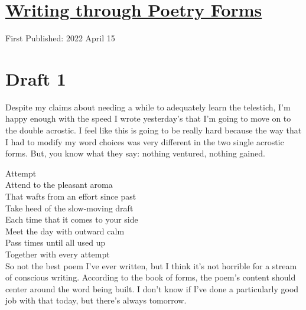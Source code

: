 \documentclass[12pt]{article}[titlepage]
\newcommand{\1}{\={a}}
\newcommand{\2}{\={e}}
\newcommand{\3}{\={\i}}
\newcommand{\4}{\=o}
\newcommand{\5}{\=u}
\newcommand{\6}{\={A}}
\renewcommand{\,}{\textsuperscript{,}}
\begin{document}
\doublespacing
\section{\href{poetry-forms-3.html}{Writing through Poetry Forms}}
First Published: 2022 April 15


\section{Draft 1}
Despite my claims about needing a while to adequately learn the telestich, I'm happy enough with the speed I wrote yesterday's that I'm going to move on to the double acrostic.
I feel like this is going to be really hard because the way that I had to modify my word choices was very different in the two single acrostic forms.
But, you know what they say: nothing ventured, nothing gained.

Attempt\\
Attend to the pleasant aroma\\
That wafts from an effort since past\\
Take heed of the slow-moving draft\\
Each time that it comes to your side\\
Meet the day with outward calm\\
Pass times until all used up\\
Together with every attempt\\

So not the best poem I've ever written, but I think it's not horrible for a stream of conscious writing.
According to the book of forms, the poem's content should center around the word being built.
I don't know if I've done a particularly good job with that today, but there's always tomorrow.
\end{document}
